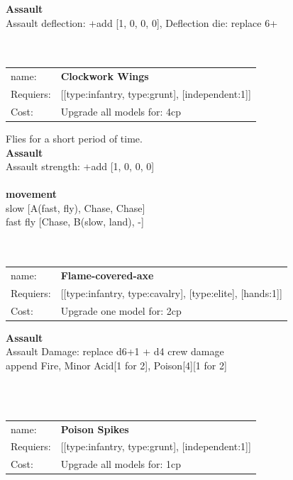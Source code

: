 {\bf Assault} \ \\
Assault deflection: +add [1, 0, 0, 0], Deflection die: replace 6+
\\ 




\ \\
\ \\
\begin{tabular}{ll}
name: & {\bf Clockwork Wings } \\
Requiers: & [[type:infantry, type:grunt], [independent:1]] \\
Cost: & Upgrade all models for: 4cp \\
\end{tabular}

Flies for a short period of time.\\ 




{\bf Assault} \ \\
Assault strength: +add [1, 0, 0, 0] 
\\ 



\ \\ {\bf movement } \\
slow [A(fast, fly), Chase, Chase] \\
fast fly [Chase, B(slow, land), -] \\

\ \\
\ \\
\begin{tabular}{ll}
name: & {\bf Flame-covered-axe } \\
Requiers: & [[type:infantry, type:cavalry], [type:elite], [hands:1]] \\
Cost: & Upgrade one model for: 2cp \\
\end{tabular}





{\bf Assault} \ \\
Assault Damage: replace d6+1 + d4 crew damage
\\ 

append Fire, Minor Acid[1 for 2], Poison[4][1 for 2]


\ \\
\ \\
\begin{tabular}{ll}
name: & {\bf Poison Spikes } \\
Requiers: & [[type:infantry, type:grunt], [independent:1]] \\
Cost: & Upgrade all models for: 1cp \\
\end{tabular}





